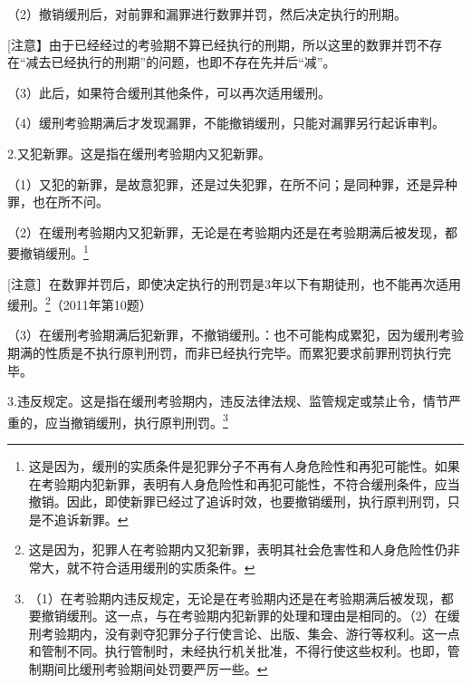 （2）撤销缓刑后，对前罪和漏罪进行数罪并罚，然后决定执行的刑期。

[注意】由于已经经过的考验期不算已经执行的刑期，所以这里的数罪并罚不存在“减去已经执行的刑期”的问题，也即不存在先并后“减”。

（3）此后，如果符合缓刑其他条件，可以再次适用缓刑。

（4）缓刑考验期满后才发现漏罪，不能撤销缓刑，只能对漏罪另行起诉审判。

2.又犯新罪。这是指在缓刑考验期内又犯新罪。

（1）又犯的新罪，是故意犯罪，还是过失犯罪，在所不问；是同种罪，还是异种罪，也在所不问。

（2）在缓刑考验期内又犯新罪，无论是在考验期内还是在考验期满后被发现，都要撤销缓刑。\footnote{这是因为，缓刑的实质条件是犯罪分子不再有人身危险性和再犯可能性。如果在考验期内犯新罪，表明有人身危险性和再犯可能性，不符合缓刑条件，应当撤销。因此，即使新罪已经过了追诉时效，也要撤销缓刑，执行原判刑罚，只是不追诉新罪。}

[注意］在数罪并罚后，即使决定执行的刑罚是3年以下有期徒刑，也不能再次适用缓刑。\footnote{这是因为，犯罪人在考验期内又犯新罪，表明其社会危害性和人身危险性仍非常大，就不符合适用缓刑的实质条件。}（2011年第10题）

（3）在缓刑考验期满后犯新罪，不撤销缓刑。：也不可能构成累犯，因为缓刑考验期满的性质是不执行原判刑罚，而非已经执行完毕。而累犯要求前罪刑罚执行完毕。

3.违反规定。这是指在缓刑考验期内，违反法律法规、监管规定或禁止令，情节严重的，应当撤销缓刑，执行原判刑罚。\footnote{（1）在考验期内违反规定，无论是在考验期内还是在考验期满后被发现，都要撤销缓刑。这一点，与在考验期内犯新罪的处理和理由是相同的。（2）在缓刑考验期内，没有剥夺犯罪分子行使言论、出版、集会、游行等权利。这一点和管制不同。执行管制时，未经执行机关批准，不得行使这些权利。也即，管制期间比缓刑考验期间处罚要严厉一些。}


